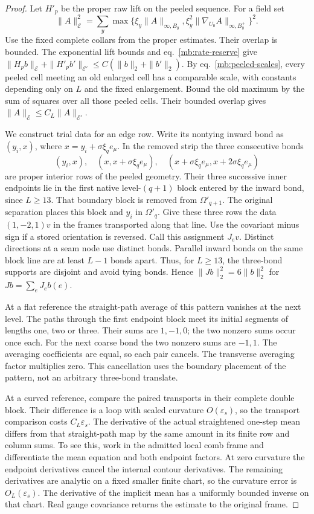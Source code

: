 \documentclass[11pt,letterpaper,reqno]{amsart}
\numberwithin{equation}{section}
\renewcommand{\eqref}[1]{\textup{eq.~\ref{#1}}}
\theoremstyle{definition}
\theoremstyle{remark}
\begin{document}
\begin{proof}
Let $H'_p$ be the proper raw lift on the peeled sequence.
For a field set
\[
 \|A\|_{\mathcal E}^2
   =\sum_y\max\{\xi_y\|A\|_{\infty,B_y},
                    \xi_y^2\|\nabla_{U_0}A\|_{\infty,B_y^+}\}^2.
\]
Use the fixed complete collars from the proper estimates.
Their overlap is bounded. The exponential lift bounds and
\eqref{mb:rate-reserve} give
$\|H_pb\|_{\mathcal E}+\|H'_pb'\|_{\mathcal E'}
 \le C(\|b\|_2+\|b'\|_2)$.
By \eqref{mb:peeled-scales}, every peeled cell meeting an
old enlarged cell has a comparable scale, with constants
depending only on $L$ and the fixed enlargement. Bound the
old maximum by the sum of squares over all those peeled
cells. Their bounded overlap gives
$\|A\|_{\mathcal E}\le C_L\|A\|_{\mathcal E'}$.

We construct trial data for an edge row. Write its nontying
inward bond as $(y_i,x)$, where
$x=y_i+\sigma\xi_qe_\mu$. In the removed strip the three
consecutive bonds
\[
 (y_i,x),\quad(x,x+\sigma\xi_qe_\mu),\quad
 (x+\sigma\xi_qe_\mu,x+2\sigma\xi_qe_\mu)
\]
are proper interior rows of the peeled geometry. Their three
successive inner endpoints lie in the first native level-$(q+1)$
block entered by the inward bond, since $L\ge13$.
That boundary block is removed from $\Omega'_{q+1}$.
The original separation places this block and $y_i$ in
$\Omega'_q$. Give these three rows the data
$(1,-2,1)v$ in the frames transported along that line.
Use the covariant minus sign if a stored orientation is reversed.
Call this assignment $J_ev$. Distinct directions at a seam node
use distinct bonds. Parallel inward bonds on the same block
line are at least $L-1$ bonds apart. Thus, for $L\ge13$, the
three-bond supports are disjoint and avoid tying bonds. Hence
$\|Jb\|_2^2=6\|b\|_2^2$ for $Jb=\sum_eJ_eb(e)$.

At a flat reference the straight-path average of this pattern
vanishes at the next level. The paths through the first
endpoint block meet its initial segments of lengths one, two
or three. Their sums are $1,-1,0$; the two nonzero sums occur
once each. For the next coarse bond the two nonzero sums are
$-1,1$. The averaging coefficients are equal, so each pair
cancels. The transverse averaging factor multiplies zero.
This cancellation uses the boundary placement of the pattern,
not an arbitrary three-bond translate.

At a curved reference, compare the paired transports in their
complete double block. Their difference is a loop with scaled
curvature $O(\varepsilon_s)$, so the transport comparison costs
$C_L\varepsilon_s$. The derivative of the actual straightened
one-step mean differs from that straight-path map by the same
amount in its finite row and column sums. To see this, work in
the admitted local comb frame and differentiate the mean
equation and both endpoint factors. At zero curvature the
endpoint derivatives cancel the internal contour derivatives.
The remaining derivatives are analytic on a fixed smaller
finite chart, so the curvature error is $O_L(\varepsilon_s)$.
The derivative of the implicit mean has a uniformly bounded
inverse on that chart. Real gauge covariance returns the
estimate to the original frame.


\end{proof}
\end{document}
